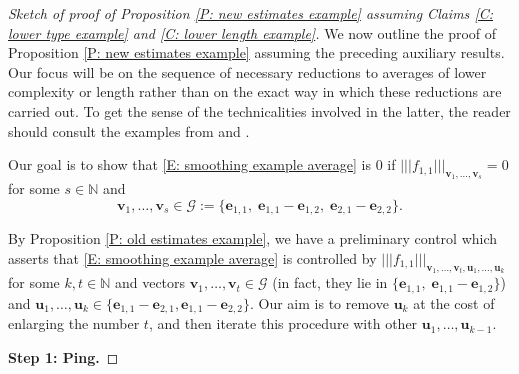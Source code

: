 \documentclass[11pt]{amsart}
\theoremstyle{definition}
\newcommand{\N}{{\mathbb N}}
\newcommand{\be}{{\mathbf{e}}}
\newcommand{\bu}{{\mathbf{u}}}
\newcommand{\bv}{{\mathbf{v}}}
\newcommand{\nnorm}[1]{\lvert\!|\!| #1|\!|\!\rvert}
\newcommand{\1}{{\mathbf{1}}}
\begin{document}

\begin{proof}[Sketch of proof of Proposition \ref{P: new estimates example} assuming Claims \ref{C: lower type example} and \ref{C: lower length example}]
   We now outline the proof of Proposition \ref{P: new estimates example} assuming the preceding auxiliary results. Our focus will be on the sequence of necessary reductions to averages of lower complexity or length rather than on the exact way in which these reductions are carried out. To get the sense of the technicalities involved in the latter, the reader should consult the examples from \cite[Section 8.1]{FrKu22a} and \cite[Section 4]{FrKu22b}.

   Our goal is to show that \eqref{E: smoothing example average} is 0 if $\nnorm{f_{1,1}}_{\bv_{1},\dots,\bv_{s}}=0$ for some $s\in\N$ and $$\bv_{1},\dots,\bv_{s}\in \mathcal{G}:=\{\be_{1,1},\; \be_{1,1}-\be_{1,2},\; \be_{2,1}-\be_{2,2}\}.$$

By Proposition \ref{P: old estimates example}, we have a preliminary control which asserts that \eqref{E: smoothing example average} is controlled by
  $\nnorm{f_{1,1}}_{\bv_{1},\dots,\bv_{t},\bu_{1},\dots,\bu_k}$ for some $k,t\in\N$ and vectors $\bv_{1},\dots,\bv_{t}\in \mathcal{G}$ (in fact, they lie in $\{\be_{1,1},\; \be_{1,1}-\be_{1,2}\}$) and $\bu_{1},\dots,\bu_k\in\{\be_{1,1}-\be_{2,1},\be_{1,1}-\be_{2,2}\}$. 
  Our aim is to remove $\bu_k$ at the cost of enlarging the number $t$, and then iterate this procedure with other $\bu_1, \ldots, \bu_{k-1}$.

 \smallskip
   \textbf{Step 1: Ping.} 
   \smallskip
   

\end{proof}
\end{document}
